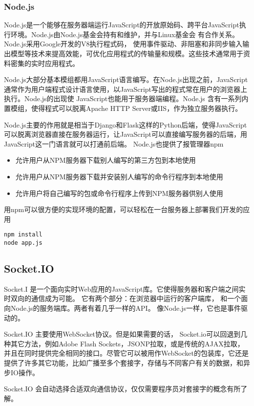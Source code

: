 \documentclass[11pt]{ctexart}
\begin{document}
\subsubsection{Node.js}
Node.js是一个能够在服务器端运行JavaScript的开放原始码、跨平台JavaScript执行环境。Node.js由Node.js基金会持有和维护，并与Linux基金会 有合作关系。Node.js采用Google开发的V8执行程式码，
使用事件驱动、非阻塞和非同步输入输出模型等技术来提高效能，可优化应用程式的传输量和规模。这些技术通常用于资料密集的实时应用程式。

Node.js大部分基本模组都用JavaScript语言编写。在Node.js出现之前，JavaScript通常作为用户端程式设计语言使用，以JavaScript写出的程式常在用户的浏览器上执行。Node.js的出现使
JavaScript也能用于服务器端编程。Node.js 含有一系列内置模组，使得程式可以脱离Apache HTTP Server或IIS，作为独立服务器执行。

Node.js主要的作用就是相当于Django和Flask这样的Python后端，使得JavaScript可以脱离浏览器直接在服务器运行，让JavaScript可以直接编写服务器的后端，用JavaScript这一门语言就可以打通前后端。
Node.js也提供了报管理器npm
\begin{itemize}
	\item 允许用户从NPM服务器下载别人编写的第三方包到本地使用
	\item 允许用户从NPM服务器下载并安装别人编写的命令行程序到本地使用
	\item 允许用户将自己编写的包或命令行程序上传到NPM服务器供别人使用
\end{itemize}
用npm可以很方便的实现环境的配置，可以轻松在一台服务器上部署我们开发的应用
\begin{verbatim}
npm install
node app.js
\end{verbatim}
\subsection{Socket.IO}
Socket.I 是一个面向实时Web应用的JavaScript库。它使得服务器和客户端之间实时双向的通信成为可能。
它有两个部分：在浏览器中运行的客户端库，
和一个面向Node.js的服务端库。两者有着几乎一样的API。
像Node.js一样，它也是事件驱动的。

Socket.IO 主要使用WebSocket协议。但是如果需要的话，
Socket.io可以回退到几种其它方法，例如Adobe Flash Sockets，JSONP拉取，或是传统的AJAX拉取，
并且在同时提供完全相同的接口。尽管它可以被用作WebSocket的包装库，它还是提供了许多其它功能，比如广播至多个套接字，存储与不同客户有关的数据，和异步IO操作。

Socket.IO 会自动选择合适双向通信协议，仅仅需要程序员对套接字的概念有所了解。
\end{document}
